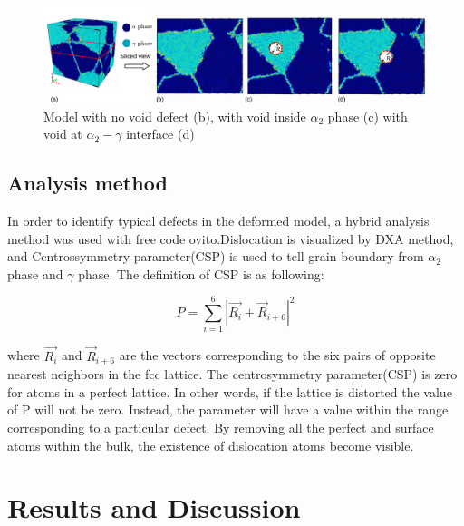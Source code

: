 \documentclass[materials,article,submit,moreauthors,pdftex,10pt,a4paper]{Definitions/mdpi}
\begin{document}
\begin{figure}[ht]
	\centering
	\includegraphics[width=1\linewidth]{img/models}
	\caption{ Model with no void defect (b), with void inside $\alpha_2$ phase (c) with void at $\alpha_2-\gamma$ interface (d)}
	\label{fig:model-creation}
\end{figure}
	
\subsection{Analysis method}
In order to identify typical defects in the deformed model, a hybrid analysis method was used with free code ovito\cite{Stukowski2010a}.Dislocation is visualized by DXA method, and Centrossymmetry parameter(CSP) is used to tell grain boundary from  $\alpha_2$ phase and $\gamma$ phase. The definition of CSP is as following:

	\begin{equation} \label{eq:csp} 
	P = \displaystyle\sum_{i=1}^{6}|\vec{R_i}+{\vec{R}}_{i+6}|^2
	\end{equation}
	
where $\vec{R_i}$ and ${\vec{R}}_{i+6}$ are the vectors corresponding to the six pairs of opposite nearest neighbors in the fcc lattice. The centrosymmetry parameter(CSP) is zero for atoms in a perfect lattice. In other words, if the lattice is distorted the value of P will not be zero. Instead, the parameter will have a value within the range corresponding to a particular defect. By removing all the perfect and surface atoms within the bulk, the existence of dislocation atoms become visible. 
 
\section{Results and Discussion}\label{section:RD}
\end{document}
